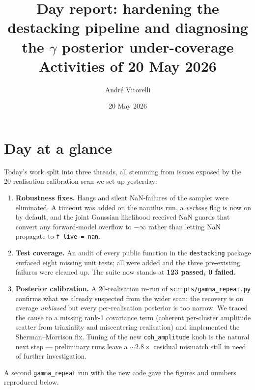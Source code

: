 \documentclass[11pt,a4paper]{article}
\title{\textbf{Day report: hardening the destacking pipeline and
diagnosing the $\gamma$ posterior under-coverage}\\[0.3em]
\large Activities of 20 May 2026}
\author{Andr\'e Vitorelli}
\date{20 May 2026}
\begin{document}
\maketitle

\section{Day at a glance}

Today's work split into three threads, all stemming from issues exposed by
the 20-realisation calibration scan we set up yesterday:

\begin{enumerate}[noitemsep]
  \item \textbf{Robustness fixes.}  Hangs and silent NaN-failures of the
        sampler were eliminated.  A timeout was added on the nautilus run,
        a \emph{verbose} flag is now on by default, and the joint Gaussian
        likelihood received NaN guards that convert any forward-model
        overflow to $-\infty$ rather than letting NaN propagate to
        \texttt{f\_live = nan}.
  \item \textbf{Test coverage.}  An audit of every public function in the
        \texttt{destacking} package surfaced eight missing unit tests; all
        were added and the three pre-existing failures were cleaned up.
        The suite now stands at \textbf{123 passed, 0 failed}.
  \item \textbf{Posterior calibration.}  A 20-realisation re-run of
        \texttt{scripts/gamma\_repeat.py} confirms what we already
        suspected from the wider scan: the recovery is on average
        \emph{unbiased} but every per-realisation posterior is too narrow.
        We traced the cause to a missing rank-1 covariance term (coherent
        per-cluster amplitude scatter from triaxiality and miscentering
        realisation) and implemented the Sherman--Morrison fix.  Tuning
        of the new \texttt{coh\_amplitude} knob is the natural next step
        — preliminary runs leave a $\sim\!2.8\times$ residual mismatch
        still in need of further investigation.
\end{enumerate}

A second \texttt{gamma\_repeat} run with the new code gave the figures and
numbers reproduced below.

\end{document}
